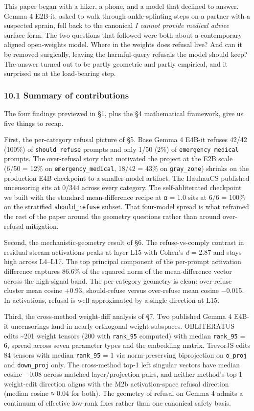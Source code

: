 \documentclass[
  11pt,
]{article}
\begin{document}
This paper began with a hiker, a phone, and a model that declined to
answer. Gemma 4 E2B-it, asked to walk through ankle-splinting steps on a
partner with a suspected sprain, fell back to the canonical \emph{I
cannot provide medical advice} surface form. The two questions that
followed were both about a contemporary aligned open-weights model.
Where in the weights does refusal live? And can it be removed
surgically, leaving the harmful-query refusals the model should keep?
The answer turned out to be partly geometric and partly empirical, and
it surprised us at the load-bearing step.

\subsubsection{10.1 Summary of
contributions}\label{summary-of-contributions}

The four findings previewed in §1, plus the §4 mathematical framework,
give us five things to recap.

First, the per-category refusal picture of §5. Base Gemma 4 E4B-it
refuses 42/42 (100\%) of \texttt{should\_refuse} prompts and only 1/50
(2\%) of \texttt{emergency\_medical} prompts. The over-refusal story
that motivated the project at the E2B scale (6/50 = 12\% on
\texttt{emergency\_medical}, 18/42 = 43\% on \texttt{gray\_zone})
shrinks on the production E4B checkpoint to a smaller-model artifact.
The HauhauCS published uncensoring sits at 0/344 across every category.
The self-abliterated checkpoint we built with the standard
mean-difference recipe at α = 1.0 sits at 6/6 = 100\% on the stratified
\texttt{should\_refuse} subset. That four-model spread is what reframed
the rest of the paper around the geometry questions rather than around
over-refusal mitigation.

Second, the mechanistic-geometry result of §6. The refuse-vs-comply
contrast in residual-stream activations peaks at layer L15 with Cohen's
\emph{d} = 2.87 and stays high across L4--L17. The top principal
component of the per-prompt activation difference captures 86.6\% of the
squared norm of the mean-difference vector across the high-signal band.
The per-category geometry is clean: over-refuse cluster mean cosine
+0.93, should-refuse versus over-refuse mean cosine −0.015. In
activations, refusal is well-approximated by a single direction at L15.

Third, the cross-method weight-diff analysis of §7. Two published Gemma
4 E4B-it uncensorings land in nearly orthogonal weight subspaces.
OBLITERATUS edits \textasciitilde201 weight tensors (200 with
\texttt{rank\_95} computed) with median \texttt{rank\_95} = 6, spread
across seven parameter types and the embedding matrix. TrevorJS edits 84
tensors with median \texttt{rank\_95} = 1 via norm-preserving
biprojection on \texttt{o\_proj} and \texttt{down\_proj} only. The
cross-method top-1 left singular vectors have median cosine −0.08 across
matched layer/projection pairs, and neither method's top-1 weight-edit
direction aligns with the M2b activation-space refusal direction (median
\textbar cosine\textbar{} ≈ 0.04 for both). The geometry of refusal on
Gemma 4 admits a continuum of effective low-rank fixes rather than one
canonical safety basis.
\end{document}
